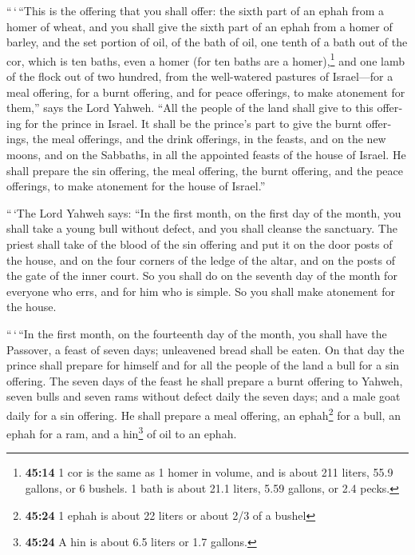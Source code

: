 \begin{paracol}{2}
\begin{otherlanguage}{english}
 ``\,`\,``This is the offering that you shall offer: the
sixth part of an ephah from a homer of wheat, and you shall give the
sixth part of an ephah from a homer of barley,  and the
set portion of oil, of the bath of oil, one tenth of a bath out of the
cor, which is ten baths, even a homer (for ten baths are a
homer),\footnote{\textbf{45:14} 1 cor is the same as 1 homer in volume,
  and is about 211 liters, 55.9 gallons, or 6 bushels. 1 bath is about
  21.1 liters, 5.59 gallons, or 2.4 pecks.}  and one lamb
of the flock out of two hundred, from the well-watered pastures of
Israel---for a meal offering, for a burnt offering, and for peace
offerings, to make atonement for them,'' says the Lord Yahweh.
 ``All the people of the land shall give to this offering
for the prince in Israel.  It shall be the prince's part
to give the burnt offerings, the meal offerings, and the drink
offerings, in the feasts, and on the new moons, and on the Sabbaths, in
all the appointed feasts of the house of Israel. He shall prepare the
sin offering, the meal offering, the burnt offering, and the peace
offerings, to make atonement for the house of Israel.''

 ``\,`The Lord Yahweh says: ``In the first month, on the
first day of the month, you shall take a young bull without defect, and
you shall cleanse the sanctuary.  The priest shall take
of the blood of the sin offering and put it on the door posts of the
house, and on the four corners of the ledge of the altar, and on the
posts of the gate of the inner court.  So you shall do on
the seventh day of the month for everyone who errs, and for him who is
simple. So you shall make atonement for the house.

 ``\,`\,``In the first month, on the fourteenth day of
the month, you shall have the Passover, a feast of seven days;
unleavened bread shall be eaten.  On that day the prince
shall prepare for himself and for all the people of the land a bull for
a sin offering.  The seven days of the feast he shall
prepare a burnt offering to Yahweh, seven bulls and seven rams without
defect daily the seven days; and a male goat daily for a sin offering.
 He shall prepare a meal offering, an ephah\footnote{\textbf{45:24}
  1 ephah is about 22 liters or about 2/3 of a bushel} for a bull, an
ephah for a ram, and a hin\footnote{\textbf{45:24} A hin is about 6.5
  liters or 1.7 gallons.} of oil to an ephah.


\end{otherlanguage}
\end{paracol}
